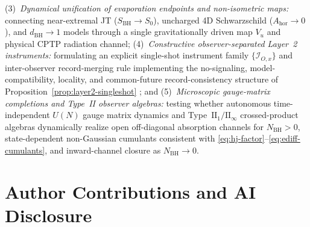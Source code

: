 \documentclass[11pt,a4paper]{article}
\theoremstyle{definition}
\theoremstyle{remark}
\newcommand{\cI}{\mathcal{I}}
\newcommand{\1}{\mathbf{1}}
\begin{document}
\begin{itemize}
  (3)~\emph{Dynamical unification of evaporation endpoints and non-isometric maps:} connecting near-extremal JT ($S_{\mathrm{BH}}\to S_0$), uncharged 4D Schwarzschild ($A_{\mathrm{hor}}\to 0$), and $d_{\mathrm{BH}}\to 1$ models through a single gravitationally driven map $V_u$ and physical CPTP radiation channel;
  (4)~\emph{Constructive observer-separated Layer~2 instruments:} formulating an explicit single-shot instrument family $\{\cI_{O,x}\}$ and inter-observer record-merging rule implementing the no-signaling, model-compatibility, locality, and common-future record-consistency structure of Proposition~\ref{prop:layer2-singleshot} \cite{AdlamRovelli2022,HausmannRenner2025}; and
  (5)~\emph{Microscopic gauge-matrix completions and Type~II observer algebras:} testing whether autonomous time-independent $U(N)$ gauge matrix dynamics \cite{BFSS1997,IKKT1997} and Type~$\mathrm{II}_1/\mathrm{II}_\infty$ crossed-product algebras \cite{CLPW2023,DeVuyst2025} dynamically realize open off-diagonal absorption channels for $N_{\mathrm{BH}}>0$, state-dependent non-Gaussian cumulants consistent with \eqref{eq:hj-factor}--\eqref{eq:ediff-cumulants}, and inward-channel closure as $N_{\mathrm{BH}}\to 0$.
\end{itemize}

\section*{Author Contributions and AI Disclosure}\label{sec:ai-disclosure}
\end{document}
